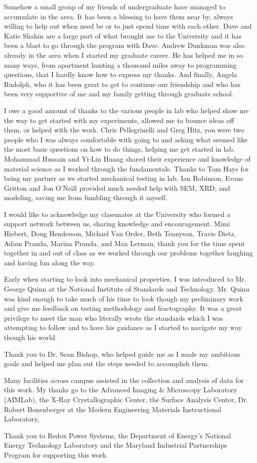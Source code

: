 Somehow a small group of my friends of undergraduate have managed to accumulate in the area.
It has been a blessing to have them near by, always willing to help out when need be or to just spend time with each other.
Dave and Katie Shahin are a large part of what brought me to the University and it has been a blast to go through the program with Dave.
Andrew Dunkman was also already in the area when I started my graduate career.
He has helped me in so many ways, from apartment hunting a thousand miles away to programming questions, that I hardly know how to express my thanks.
And finally, Angela Rudolph, who it has been great to get to continue our friendship and who has been very supportive of me and my family getting through graduate school.

I owe a good amount of thanks to the various people in lab who helped show me the way to get started with my experiments, allowed me to bounce ideas off them, or helped with the work.
Chris Pellegrinelli and Greg Hitz, you were two people who I was always comfortable with going to and asking what seemed like the most basic questions on how to do things, helping me get started in lab.
Mohammad Hussain and Yi-Lin Huang shared their experience and knowledge of material science as I worked through the fundamentals.
Thanks to Tom Hays for being my partner as we started mechanical testing in lab.
Ian Robinson, Evans Gritton and Jon O'Neill provided much needed help with SEM, XRD, and modeling, saving me from fumbling through it myself.

I would like to acknowledge my classmates at the University who formed a support network between us, sharing knowledge and encouragement.
Mimi Hiebert, Doug Henderson, Michael Van Order, Beth Tennyson, Travis Dietz, Adam Pranda, Marina Pranda, and Max Lerman, thank you for the time spent together in and out of class as we worked through our problems together laughing and having fun along the way.

Early when starting to look into mechanical properties, I was introduced to Mr. George Quinn at the National Institute of Standards and Technology.
Mr. Quinn was kind enough to take much of his time to look though my preliminary work and give me feedback on testing methodology and fractography.
It was a great privilege to meet the man who literally wrote the standards which I was attempting to follow and to have his guidance as I started to navigate my way though his world.

Thank you to Dr. Sean Bishop, who helped guide me as I made my ambitious goals and helped me plan out the steps needed to accomplish them.

Many facilities across campus assisted in the collection and analysis of data for this work. My thanks go to the Advanced Imaging \& Microscopy Laboratory (AIMLab), the X-Ray Crystallographic Center, the Surface Analysis Center, Dr. Robert Bonenberger at the Modern Engineering Materials Instructional Laboratory,

Thank you to Redox Power Systems, the Department of Energy's National Energy Technology Laboratory and the Maryland Industrial Partnerships Program for supporting this work.
